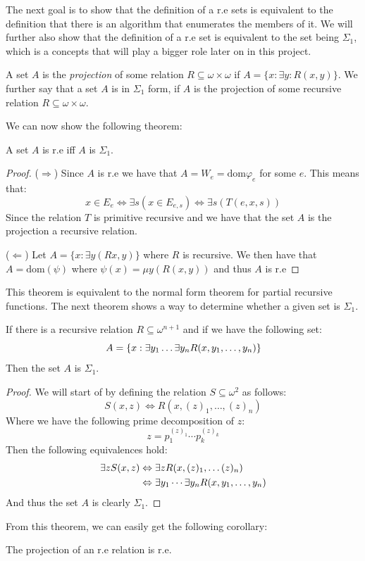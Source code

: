 \documentclass[../main.tex]{subfiles}
\begin{document}
The next goal is to show that the definition of a r.e sets is equivalent to the
definition that there is an algorithm that enumerates the members of it. We
will further also show that the definition of a r.e set is equivalent to the
set being $\Sigma_1$, which is a concepts that will play a bigger role later on
in this project.
\begin{defi}
	A set $A$ is the \textit{projection} of some relation $R\subseteq
	\omega\times\omega$ if $A=\{x:\exists y: R(x,y)\}$. We further say that
	a set $A$ is in $\Sigma_1$ form, if $A$ is the projection of some
	recursive relation $R\subseteq\omega\times\omega$.
\end{defi}
We can now show the following theorem:
\begin{thm}
	A set $A$ is r.e iff $A$ is $\Sigma_1$.
\end{thm}
\begin{proof}
	($\Rightarrow$) Since $A$ is r.e we have that $A=W_e=\text{dom} \varphi_e$
	for some $e$. This means that:
	$$x\in E_e\Leftrightarrow\exists s(x\in E_{e,s})\Leftrightarrow \exists
	s(T(e,x,s))$$
	Since the relation $T$ is primitive recursive and we have that the set $A$
	is the projection a recursive relation.

	($\Leftarrow$) Let $A=\{x:\exists y(Rx,y)\}$ where $R$ is recursive. We
	then have that $A=\text{dom} (\psi)$ where $\psi(x)=\mu y(R(x,y))$ and thus $A$
	is r.e
\end{proof}
This theorem is equivalent to the normal form theorem for partial recursive
functions. The next theorem shows a way to determine whether a given set is
$\Sigma_1$.
\begin{thm}
	\label{thm:RecSigma}
	If there is a recursive relation $R\subseteq\omega^{n+1}$ and if we
	have the following set:
	$$A=\{x:\exists y_1\ldots\exists  y_n R(x,y_1,\ldots,y_n)\}$$
	Then the set $A$ is $\Sigma_1$.
\end{thm}
\begin{proof}
	We will start of by defining the relation $S\subseteq\omega^2$ as
	follows:
	$$S(x,z)\Leftrightarrow R(x,(z)_1,\ldots,(z)_n)$$
	Where we have the following prime decomposition of $z$:
	$$z=p_1^{(z)_1}\cdots p_k^{(z)_k}$$
	Then the following equivalences hold:
	\begin{align*}
		\exists zS(x,z)&\Leftrightarrow \exists z R(x,(z)_1,\ldots
		(z)_n)\\
			       &\Leftrightarrow \exists y_1\cdots \exists y_n
			       R(x,y_1,\ldots,y_n)
	\end{align*}
	And thus the set $A$ is clearly $\Sigma_1$.
\end{proof}
From this theorem, we can easily get the following corollary:
\begin{cor}
	The projection of an r.e relation is r.e.
\end{cor}
\end{document}
